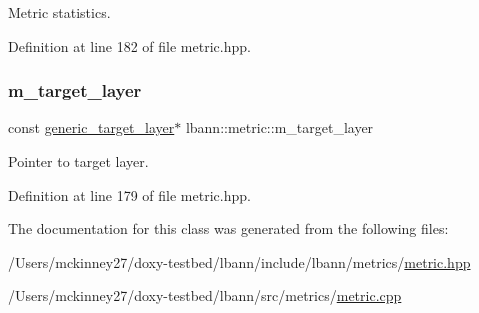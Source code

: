Metric statistics. 

Definition at line 182 of file metric.\+hpp.

\mbox{\label{classlbann_1_1metric_a2bf6c53efb1b525bfa63a8c3167968d9}} 
\subsubsection{\texorpdfstring{m\+\_\+target\+\_\+layer}{m\_target\_layer}}
{\footnotesize\ttfamily const \hyperlink{classlbann_1_1generic__target__layer}{generic\+\_\+target\+\_\+layer}$\ast$ lbann\+::metric\+::m\+\_\+target\+\_\+layer\hspace{0.3cm}{\ttfamily [private]}}

Pointer to target layer. 

Definition at line 179 of file metric.\+hpp.



The documentation for this class was generated from the following files\+:\begin{DoxyCompactItemize}
\item 
/\+Users/mckinney27/doxy-\/testbed/lbann/include/lbann/metrics/\hyperlink{metric_8hpp}{metric.\+hpp}\item 
/\+Users/mckinney27/doxy-\/testbed/lbann/src/metrics/\hyperlink{metric_8cpp}{metric.\+cpp}\end{DoxyCompactItemize}
